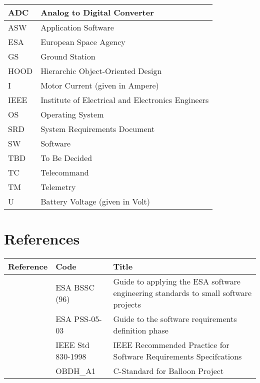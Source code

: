 \begin{table}[H]
\centering
\begin{tabular}{|L{2cm}|L{9cm}|}
\hline
 ADC & Analog to Digital Converter\\
 \hline
 ASW & Application Software  \\
 \hline
 ESA & European Space Agency\\
 \hline
 GS & Ground Station\\
 \hline
 HOOD & Hierarchic Object-Oriented Design\\
 \hline
 I & Motor Current (given in Ampere)\\
 \hline
 IEEE & Institute of Electrical and Electronics Engineers\\
 \hline
 OS & Operating System\\
 \hline
 SRD & System Requirements Document\\
 \hline
 SW & Software\\
 \hline
 TBD & To Be Decided\\
 \hline
 TC & Telecommand\\
 \hline
 TM & Telemetry\\
 \hline
 U & Battery Voltage (given in Volt)\\
 \hline
\end{tabular}
\label{tab:abbr}
\end{table}


\section{References}

\begin{table}[H]
\centering
\begin{tabular}{|L{2cm}|L{4cm}|L{8cm}|}
\hline
Reference & Code & Title \\
\hline
\hline
[1] & ESA BSSC (96) & Guide to applying the ESA software engineering standards to small software projects\\
\hline
[2] & ESA PSS-05-03 & Guide to the software requirements definition phase\\
\hline
[3] & IEEE Std 830-1998 & IEEE Recommended Practice for Software Requirements Specifcations\\
\hline
[4] & OBDH\_A1 & C-Standard for Balloon Project\\
\hline
\end{tabular}
\end{table}

\newpage

